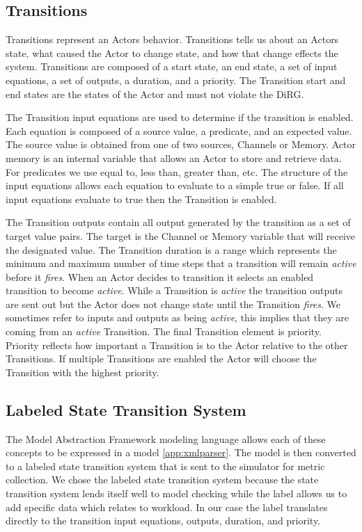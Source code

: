 \subsection{Transitions}
Transitions represent an Actors behavior.  Transitions tells us about an Actors state, what caused the Actor to change state, and how that change effects the system.  Transitions are composed of a start state, an end state, a set of input equations, a set of outputs, a duration, and a priority.  The Transition start and end states are the states of the Actor and must not violate the DiRG.  

The Transition input equations are used to determine if the transition is enabled.  Each equation is composed of a source value, a predicate, and an expected value.  The source value is obtained from one of two sources, Channels or Memory.  Actor memory is an internal variable that allows an Actor to store and retrieve data.  For predicates we use equal to, less than, greater than, etc.  The structure of the input equations allows each equation to evaluate to a simple true or false.  If all input equations evaluate to true then the Transition is enabled.  

The Transition outputs contain all output generated by the transition as a set of target value pairs.  The target is the Channel or Memory variable that will receive the designated value.  The Transition duration is a range which represents the minimum and maximum number of time steps that a transition will remain {\em active} before it {\em fires}.  When an Actor decides to transition it selects an enabled transition to become {\em active}.  While a Transition is {\em active} the transition outputs are sent out but the Actor does not change state until the Transition {\em fires}.  We sometimes refer to inputs and outputs as being {\em active}, this implies that they are coming from an {\em active} Transition.  The final Transition element is priority.  Priority reflects how important a Transition is to the Actor relative to the other Transitions.  If multiple Transitions are enabled the Actor will choose the Transition with the highest priority.

\subsection{Labeled State Transition System}
The Model Abstraction Framework modeling language allows each of these concepts to be expressed in a model \ref{app:xmlparser}.  The model is then converted to a labeled state transition system that is sent to the simulator for metric collection.  We chose the labeled state transition system because the state transition system lends itself well to model checking while the label allows us to add specific data which relates to workload.  In our case the label translates directly to the transition input equations, outputs, duration, and priority.

